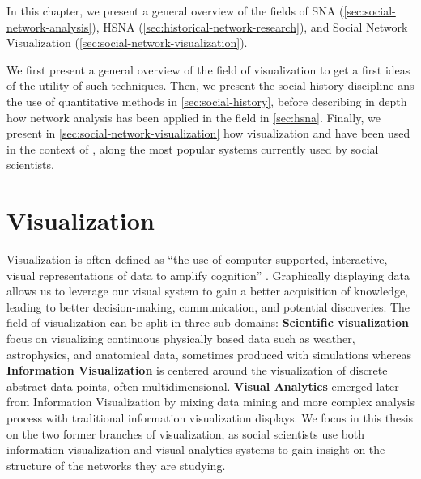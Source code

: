 In this chapter, we present a general overview of the fields of SNA (\autoref{sec:social-network-analysis}), HSNA (\autoref{sec:historical-network-research}), and Social Network Visualization (\autoref{sec:social-network-visualization}).

We first present a general overview of the field of visualization to get a first ideas of the utility of such techniques.
Then, we present the social history discipline ans the use of quantitative methods in \autoref{sec:social-history}, before describing in depth how network analysis has been applied in the field in \autoref{sec:hsna}.
Finally, we present in \autoref{sec:social-network-visualization} how visualization and \va have been used in the context of \hsna, along the most popular systems currently used by social scientists.


\section{Visualization}\label{sec:visualization}

Visualization is often defined as ``the use of computer-supported, interactive, visual representations of data to amplify cognition'' \cite{cardReadingsInformationVisualization1999}.
Graphically displaying data allows us to leverage our visual system to gain a better acquisition of knowledge, leading to better decision-making, communication, and potential discoveries.
The field of visualization can be split in three sub domains: \textbf{Scientific visualization} focus on visualizing continuous physically based data such as weather, astrophysics, and anatomical data, sometimes produced with simulations whereas \textbf{Information Visualization} is centered around the visualization of discrete abstract data points, often multidimensional. \textbf{Visual Analytics} emerged later from Information Visualization by mixing data mining and more complex analysis process with traditional information visualization displays.
We focus in this thesis on the two former branches of visualization, as social scientists use both information visualization and visual analytics systems to gain insight on the structure of the networks they are studying.


